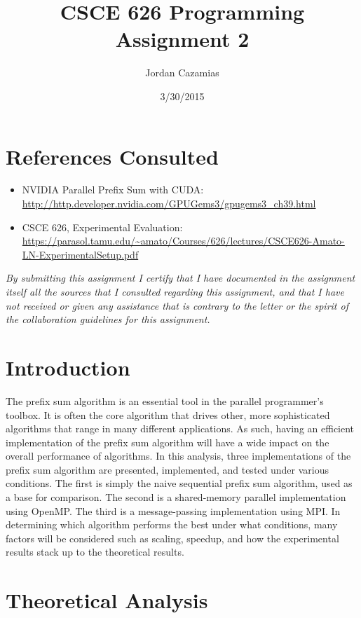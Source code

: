 \documentclass{article}
\begin{document}
\title{CSCE 626 Programming Assignment 2}
\author{Jordan Cazamias}
\date{3/30/2015}
\maketitle

\section*{References Consulted}

\begin{itemize}
\item NVIDIA Parallel Prefix Sum with CUDA: \url{http://http.developer.nvidia.com/GPUGems3/gpugems3_ch39.html} 
\item CSCE 626, Experimental Evaluation: \url{https://parasol.tamu.edu/~amato/Courses/626/lectures/CSCE626-Amato-LN-ExperimentalSetup.pdf}
\end{itemize}

\textit{By submitting this assignment I certify that I have documented in the assignment itself all the sources that I consulted regarding this assignment, and that I have not received or given any assistance that is contrary to the letter or the spirit of the collaboration guidelines for this assignment.}

\section{Introduction}
The prefix sum algorithm is an essential tool in the parallel programmer's toolbox.  It is often the core algorithm that drives other, more sophisticated algorithms that range in many different applications.  As such, having an efficient implementation of the prefix sum algorithm will have a wide impact on the overall performance of algorithms.  In this analysis, three implementations of the prefix sum algorithm are presented, implemented, and tested under various conditions.  The first is simply the naive sequential prefix sum algorithm, used as a base for comparison.  The second is a shared-memory parallel implementation using OpenMP.  The third is a message-passing implementation using MPI.  In determining which algorithm performs the best under what conditions, many factors will be considered such as scaling, speedup, and how the experimental results stack up to the theoretical results.

\section{Theoretical Analysis}
\end{document}

